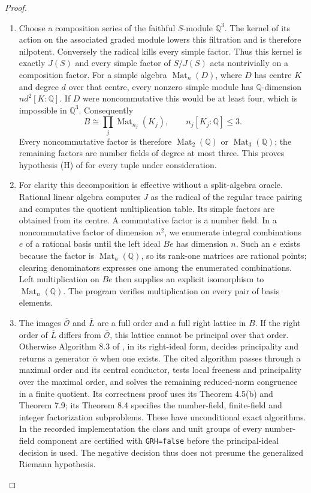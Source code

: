 \begin{proof}
\begin{enumerate}[label=\arabic*.]
\item Choose a composition series of the faithful $S$-module $\mathbb Q^3$.
The kernel of its action on the associated graded module lowers this
filtration and is therefore nilpotent. Conversely the radical kills
every simple factor. Thus this kernel is exactly $J(S)$ and every
simple factor of $S/J(S)$ acts nontrivially on a composition factor.
For a simple algebra $\operatorname{Mat}_n(D)$, where $D$ has centre
$K$ and degree $d$ over that centre, every nonzero simple module has
$\mathbb Q$-dimension $n d^2[K:\mathbb Q]$. If $D$ were
noncommutative this would be at least four, which is impossible in
$\mathbb Q^3$. Consequently
\[
 B\cong\prod_j\operatorname{Mat}_{n_j}(K_j),\qquad
 n_j[K_j:\mathbb Q]\le3.                                    \tag{F.IC3}\label{maps:eq:F.IC3}
\]
Every noncommutative factor is therefore
$\operatorname{Mat}_2(\mathbb Q)$ or
$\operatorname{Mat}_3(\mathbb Q)$; the remaining factors are number
fields of degree at most three. This proves hypothesis (H) of
\cite[Algorithm 8.3, p.~21]{rootBHJ22} for every tuple under consideration.

\item For clarity this decomposition is effective without a split-algebra
oracle. Rational linear algebra computes $J$ as the radical of the
regular trace pairing and computes the quotient multiplication table.
Its simple factors are obtained from its centre. A commutative factor
is a number field. In a noncommutative factor of dimension $n^2$, we
enumerate integral combinations $e$ of a rational basis until the
left ideal $Be$ has dimension $n$. Such an $e$ exists because the
factor is $\operatorname{Mat}_n(\mathbb Q)$, so its rank-one matrices
are rational points; clearing denominators expresses one among the
enumerated combinations. Left multiplication on $Be$ then supplies
an explicit isomorphism to $\operatorname{Mat}_n(\mathbb Q)$.
The program verifies multiplication on every pair of basis elements.

\item The images $\overline{\mathcal O}$ and $\overline L$ are a full order
and a full right lattice in $B$. If the right order of
$\overline L$ differs from $\overline{\mathcal O}$, this lattice
cannot be principal over that order. Otherwise Algorithm 8.3 of
\cite[Algorithm 8.3 and its correctness proof, p.~21]{rootBHJ22}, in its right-ideal form, decides principality and
returns a generator $\overline\alpha$ when one exists. The cited
algorithm passes through a maximal order and its central conductor,
tests local freeness and principality over the maximal order, and
solves the remaining reduced-norm congruence in a finite quotient.
Its correctness proof uses its Theorem 4.5(b) and Theorem 7.9; its
Theorem 8.4 specifies the number-field, finite-field and integer
factorization subproblems. These have unconditional exact algorithms.
In the recorded implementation the class and unit groups of every
number-field component are certified with \texttt{GRH=false} before
the principal-ideal decision is used. The negative decision thus
does not presume the generalized Riemann hypothesis.


\end{enumerate}
\end{proof}
